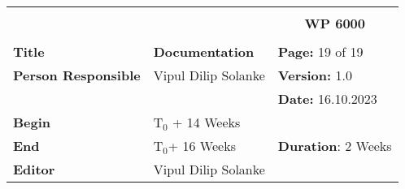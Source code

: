 \begin{table}[!h]
  \begin{center}
    \begin{tabular}{|p{35mm}||p{55mm}|p{50mm}||p{40mm}|}
      \hline
      \multicolumn{3}{|l||}{\textbf{}} & \multicolumn{1}{c|}{}                                                                                                                                                \\
      \multicolumn{3}{|l||}{\textbf{}} & \multicolumn{1}{c|}{\textbf{WP 6000}}                                                                                                                                \\
      \multicolumn{3}{|l||}{\textbf{}} & \multicolumn{1}{c|}{}                                                                                                                                                \\
      \hline\hline
      \textbf{Title}                   & \multicolumn{2}{p{7cm}||}{\textbf{Documentation}}
                                       & \textbf{Page:} 19 of 19                                                                                                                                             \\
      \hline
      \textbf{Person Responsible}        & \multicolumn{2}{l||}{Vipul Dilip Solanke}                                                                                                   & \textbf{Version:} 1.0   \\
      \hline
      \multicolumn{3}{|l||}{}          & \textbf{Date:} 16.10.2023                                                                                                                                          \\
      \hline\hline
      \textbf{Begin}                  & \multicolumn{2}{l||}{T$_0$ + 14 Weeks}                                                                                                                &                         \\
      \hline
      \textbf{End}                    & \multicolumn{2}{l||}{T$_0$+ 16 Weeks}                                                                                                        & \textbf{Duration}: 2 Weeks \\
      \hline\hline
      \textbf{Editor}              & \multicolumn{3}{l|}{Vipul Dilip Solanke}                                                                                                                              \\

\end{tabular}
\end{center}
\end{table}
